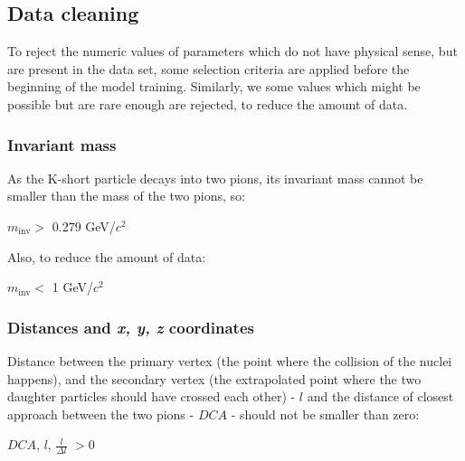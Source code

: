 \subsection{Data cleaning}
To reject the numeric values of parameters which do not have physical sense, but are present in the data set, some selection criteria are applied before the beginning of the model training. Similarly, we some values which might be possible but are rare enough are rejected, to reduce the amount of data.

\subsubsection{Invariant mass}
As the K-short particle decays into two pions, its invariant mass cannot be smaller than the mass of the two pions, so:
\begin{center}
    $m_\text{inv} >$ 0.279 GeV/$c^2$
\end{center}
Also, to reduce the amount of data:
\begin{center}
   $m_\text{inv} <$ 1 GeV/$c^2$
\end{center}

\subsubsection{Distances and \emph{x, y, z} coordinates}
Distance between the primary vertex (the point where the collision of the nuclei happens), and the secondary vertex (the extrapolated point where the two daughter particles should have crossed each other)  - $l$ and the distance of closest approach between the two pions - $DCA$ - should not be smaller than zero:
\begin{center}
    $DCA$, $l$, $\frac{l}{\Delta l}$ $> 0$
\end{center}

